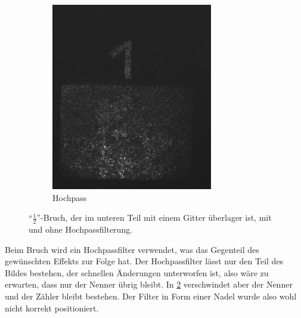 \documentclass[
	a4paper,
	12pt,
	pagesize,
	ngerman
]{scrartcl}
\begin{document}
\begin{itemize}
\begin{figure}[H]
\begin{subfigure}[b]{0.475\textwidth}
            \includegraphics[width=\textwidth]{raw/4/4_halb_hochpass}
            \caption[]%
            {Hochpass}
            \label{fig_4_halb_filter}
        \end{subfigure}
        \caption%
        {
				\enquote{$\frac{1}{2}$}-Bruch, der im unteren Teil mit einem Gitter überlager ist, mit und ohne Hochpassfilterung.
				}
        \label{fig_4_halb}
    \end{figure}
	Beim Bruch wird ein Hochpassfilter verwendet, was das Gegenteil des gewünschten Effekts zur Folge hat.
	Der Hochpassfilter lässt nur den Teil des Bildes bestehen, der schnellen Änderungen unterworfen ist, also wäre zu erwarten, dass nur der Nenner übrig bleibt.
	In \cref{fig_4_halb} verschwindet aber der Nenner und der Zähler bleibt bestehen.
	Der Filter in Form einer Nadel wurde also wohl nicht korrekt positioniert.


\end{itemize}
\end{document}
